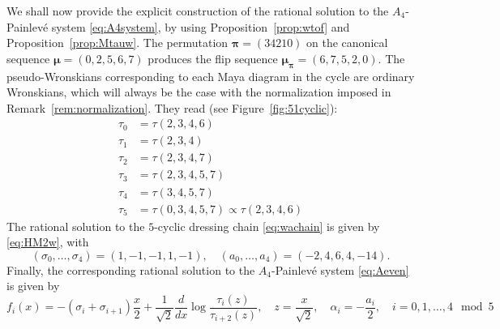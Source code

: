 \documentclass{amsart}
\theoremstyle{definition}
\newcommand{\bmu}{{\boldsymbol{\mu}}}
\newcommand{\bpi}{{\boldsymbol{\pi}}}
\begin{document}
We shall now provide the explicit construction of the rational
solution to the $A_4$-Painlev\'e system \eqref{eq:A4system}, by using
Proposition~\ref{prop:wtof} and Proposition~\ref{prop:Mtauw}. The
permutation $\bpi=(34210)$ on the canonical sequence
$\bmu=(0,2,5,6,7)$ produces the flip sequence
$\bmu_\bpi=(6,7,5,2,0)$. The pseudo-Wronskians corresponding to each
Maya diagram in the cycle are ordinary Wronskians, which will always
be the case with the normalization imposed in
Remark~\ref{rem:normalization}. They read (see
Figure~\ref{fig:51cyclic}):
\begin{align*}
  \tau_0&=\tau(2,3,4,6)\\
  \tau_1&=\tau(2,3,4)\\
  \tau_2&=\tau(2,3,4,7)\\
  \tau_3&=\tau(2,3,4,5,7)\\
  \tau_4&=\tau(3,4,5,7)\\
  \tau_5&=\tau(0,3,4,5,7)\propto \tau(2,3,4,6)
\end{align*}
The rational solution to the $5$-cyclic dressing
chain \eqref{eq:wachain} is given by  \eqref{eq:HM2w},  with
\[ (\sigma_0,\ldots, \sigma_4) = (1,-1,-1,1,-1),\quad (a_0,\ldots,
  a_4) = (-2,4,6,4,-14).\] Finally, the corresponding rational
solution to the $A_4$-Painlev\'e system \eqref{eq:Aeven} is given by
\[
 f_i(x) = - (\sigma_i+\sigma_{i+1})\frac{x}{2} +\frac{1}{\sqrt{2}}
  \frac{d}{dx} \log \frac{\tau_{i}(z)}{\tau_{i+2}(z)} ,\quad z=
  \frac{x}{\sqrt{2}},\quad \alpha_i = -\frac{a_i}2,\quad
  i=0,1,\ldots, 4 \mod 5
\]
\end{document}
